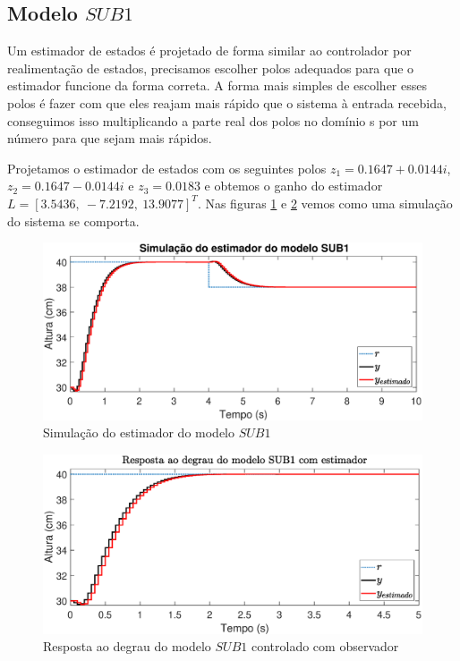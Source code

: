 \subsection{Modelo $SUB1$}
Um estimador de estados é projetado de forma similar ao controlador por realimentação de estados, precisamos escolher polos adequados para que o estimador funcione da forma correta. A forma mais simples de escolher esses polos é fazer com que eles reajam mais rápido que o sistema à entrada recebida, conseguimos isso multiplicando a parte real dos polos no domínio s por um número para que sejam mais rápidos. 


Projetamos o estimador de estados com os seguintes polos $z_1=0.1647 + 0.0144i$, $z_2=0.1647 - 0.0144i$ e $z_3=0.0183$ e obtemos o ganho do estimador $L=[3.5436,~-7.2192,~13.9077]^T$. Nas figuras \ref{fig:estimadorsub1} e \ref{fig:stepestsub1} vemos como uma simulação do sistema se comporta.

\begin{figure}[H]
	\centering
	\includegraphics[width=1\linewidth]{estimadorsub1}
	\caption[Simulação do estimador do modelo $SUB1$]{Simulação do estimador do modelo $SUB1$}
	\label{fig:estimadorsub1}
\end{figure}

\begin{figure}[H]
	\centering
	\includegraphics[width=1\linewidth]{stepestsub1}
	\caption[Resposta ao degrau do modelo $SUB1$ controlado com observador]{Resposta ao degrau do modelo $SUB1$ controlado com observador}
	\label{fig:stepestsub1}
\end{figure}



